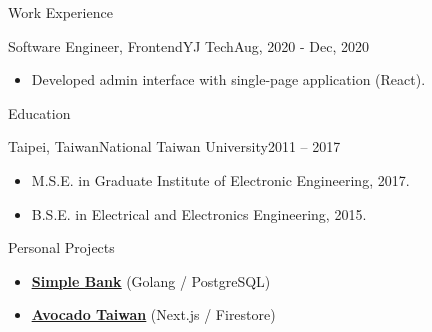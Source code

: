 \documentclass[]{mcdowellcv}
\begin{document}
\begin{cvsection}{Work Experience}
		\begin{cvsubsection}{Software Engineer, Frontend}{YJ Tech}{Aug, 2020 - Dec, 2020}
			\begin{itemize}
				\item Developed admin interface with single-page application (React).
			\end{itemize}
		\end{cvsubsection}
	\end{cvsection}
	
	\begin{cvsection}{Education}
		\begin{cvsubsection}{Taipei, Taiwan}{National Taiwan University}{2011 -- 2017}
			\begin{itemize}
				\item M.S.E. in Graduate Institute of Electronic Engineering, 2017.
				\item B.S.E. in Electrical and Electronics Engineering, 2015.
			\end{itemize}
		\end{cvsubsection}
	\end{cvsection}
	
	\begin{cvsection}{Personal Projects}
		\begin{cvsubsection}{}{}{}
			\begin{itemize}
				\item \textbf{\underline{\href{https://github.com/hhow09/simple_bank}{Simple Bank}}} (Golang / PostgreSQL)
				\item \textbf{\underline{\href{https://avocadotaiwan.com}{Avocado Taiwan}}} (Next.js / Firestore)
			\end{itemize}
		\end{cvsubsection}
	\end{cvsection}
	
\end{document}
